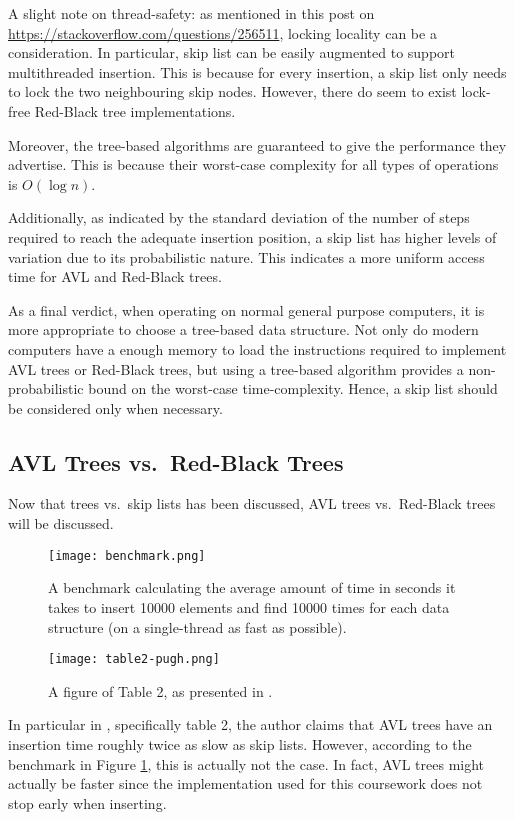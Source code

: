 \documentclass[article]{uom-coursework}
\begin{document}
A slight note on thread-safety: as mentioned in this post on
\url{https://stackoverflow.com/questions/256511}, locking
locality can be a consideration. In particular, skip list can be
easily augmented to support multithreaded insertion. This is
because for every insertion, a skip list only needs to lock the
two neighbouring skip nodes. However, there do seem to exist
lock-free Red-Black tree implementations.

Moreover, the tree-based algorithms are guaranteed to give the
performance they advertise. This is because
their worst-case complexity for all types of operations
is $O(\log n)$.

Additionally, as indicated by the standard deviation of the
number of steps required to reach the adequate insertion
position, a skip list has higher levels of variation due to its
probabilistic nature. This indicates a more uniform access time
for AVL and Red-Black trees.

As a final verdict, when operating on normal general purpose
computers, it is more appropriate to choose a tree-based data
structure. Not only do modern computers have a enough memory to
load the instructions required to implement AVL trees or
Red-Black trees, but using a tree-based algorithm provides a
non-probabilistic bound on the worst-case time-complexity.
Hence, a skip list should be considered only when necessary.

\subsection{AVL Trees vs.\ Red-Black Trees}

Now that trees vs.\ skip lists has been discussed, AVL trees
vs.\ Red-Black trees will be discussed.

\begin{figure}[H]
\centering
\texttt{[image: benchmark.png]}
\caption{A benchmark calculating the average amount of time in
seconds it takes to insert 10000 elements and find 10000 times
for each data structure (on a single-thread as fast as
possible).}
\label{fig:benchmark}
\end{figure}

\begin{figure}[H]
\centering
\texttt{[image: table2-pugh.png]}
\caption{A figure of Table 2, as presented in \textcite{pugh90}.}
\label{fig:test9}
\end{figure}

In particular in \textcite{pugh90}, specifically table 2, the
author claims that AVL trees have an insertion time roughly
twice as slow as skip lists. However, according to the benchmark
in Figure \ref{fig:benchmark}, this is actually not the case. In
fact, AVL trees might actually be faster since the
implementation used for this coursework does not stop early when
inserting.
\end{document}

